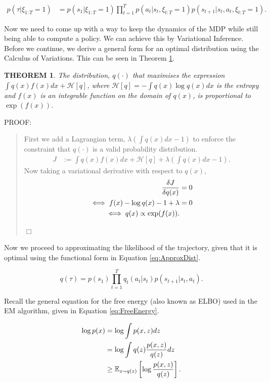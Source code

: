 \documentclass{report}
\newtheorem{theorem}{THEOREM}
\newenvironment{proof}{
PROOF:
\begin{quotation}}{
$\Box$ \end{quotation}}
\numberwithin{equation}{section}
\numberwithin{figure}{section}
\numberwithin{table}{section}
\numberwithin{algorithm}{section}
\begin{document}
\begin{align}\label{eq:changedDynamics}
  p(\tau|\xi_{1:T}=1)&=p(s_1|\xi_{1:T}=1)\prod_{t=1}^Tp(a_t|s_t,\xi_{t:T}=1)p(s_{t+1}|s_t, a_t, \xi_{t:T}=1).
\end{align}

Now we need to come up with a way to keep the dynamics of the MDP 
while still being able to compute a policy. 
We can achieve this by Variational Inference. Before we continue, 
we derive a general form for an optimal distribution using 
the Calculus of Variations. This can be seen in Theorem \ref{thm:OptDist}.

\begin{theorem}\label{thm:OptDist}
  The distribution, $q(\cdot)$ that maximises the expression 
  $\int q(x)f(x)dx + \mathcal{H}[q]$, where $\mathcal{H}[q]=-\int q(x)\log q(x)dx$
  is the entropy 
  and $f(x)$ is an integrable function on the domain of $q(x)$, 
  is proportional to $\exp (f(x))$.
\end{theorem}

\begin{proof}
  First we add a Lagrangian term, $\lambda(\int q(x)dx - 1)$ to 
  enforce the constraint that $q(\cdot)$ is a valid probability 
  distribution.
  \begin{align}
    J&:=\int q(x)f(x)dx + \mathcal{H}[q] + \lambda(\int q(x)dx - 1).
  \end{align}
  Now taking a variational derivative with respect to $q(x)$,
  \begin{align}
    \frac{\delta J}{\delta q(x)} &=0\notag\\
    \iff f(x) - \log q(x) - 1 + \lambda &=0\notag\\
    \iff q(x)\propto \exp(f(x)).
  \end{align}
\end{proof}

Now we proceed to approximating the likelihood of the trajectory, 
given that it is optimal using the functional form in Equation 
\ref{eq:ApproxDist}.

\begin{equation}\label{eq:ApproxDist}
  q(\tau)=p(s_1)\prod_{t=1}^Tq_t(a_t|s_t)p(s_{t+1}|s_t,a_t).
\end{equation}

Recall the general equation for the free energy (also known as ELBO) 
used in the EM algorithm, given in Equation \ref{eq:FreeEnergy}.

\begin{align}\label{eq:FreeEnergy}
  \log p(x)&=\log \int p(x,z)dz\notag\\
  &=\log \int q(z)\frac{p(x,z)}{q(z)}dz\notag\\
  &\ge \mathbb{E}_{z\sim q(z)}\left[\log \frac{p(x, z)}{q(z)}\right].
\end{align}
\end{document}
